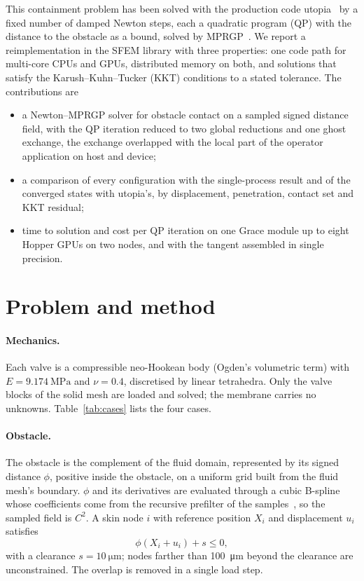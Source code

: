 \documentclass[sigconf,nonacm]{acmart}
\begin{document}
This containment problem has been solved with the production code utopia~\cite{zulian2021utopia}
by a fixed number of damped Newton steps, each a quadratic program (QP) with the distance to the
obstacle as a bound, solved by MPRGP~\cite{dostal2005mprgp}. We report a reimplementation in the
SFEM library with three properties: one code path for multi-core CPUs and GPUs, distributed memory
on both, and solutions that satisfy the Karush--Kuhn--Tucker (KKT) conditions to a stated
tolerance. The contributions are
\begin{itemize}
\item a Newton--MPRGP solver for obstacle contact on a sampled signed distance field, with the
  QP iteration reduced to two global reductions and one ghost exchange, the exchange overlapped
  with the local part of the operator application on host and device;
\item a comparison of every configuration with the single-process result and of the converged
  states with utopia's, by displacement, penetration, contact set and KKT residual;
\item time to solution and cost per QP iteration on one Grace module up to eight Hopper GPUs on
  two nodes, and with the tangent assembled in single precision.
\end{itemize}

\section{Problem and method}

\paragraph{Mechanics.} Each valve is a compressible neo-Hookean body (Ogden's volumetric term)
with $E=\SI{9.174}{\mega\pascal}$ and $\nu=0.4$, discretised by linear tetrahedra. Only the valve
blocks of the solid mesh are loaded and solved; the membrane carries no unknowns.
Table~\ref{tab:cases} lists the four cases.

\paragraph{Obstacle.} The obstacle is the complement of the fluid domain, represented by its
signed distance $\phi$, positive inside the obstacle, on a uniform grid built from the fluid
mesh's boundary. $\phi$ and its derivatives are evaluated through a cubic B-spline whose
coefficients come from the recursive prefilter of the samples~\cite{unser1999}, so the sampled
field is $C^2$. A skin node $i$ with reference position $X_i$ and displacement $u_i$ satisfies
\begin{equation}
  \phi(X_i + u_i) + s \le 0 ,
\end{equation}
with a clearance $s=\SI{10}{\micro\metre}$; nodes farther than \SI{100}{\micro\metre} beyond
the clearance are unconstrained. The overlap is removed in a single load step.
\end{document}
